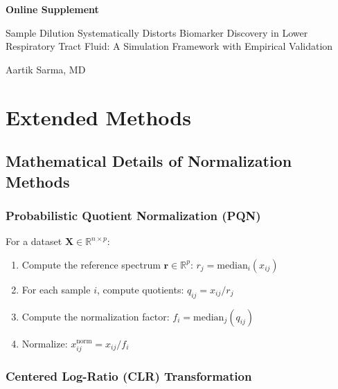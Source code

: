 \documentclass[12pt]{article}
\begin{document}
\begin{center}
{\Large\bfseries Online Supplement}

\vspace{0.5cm}

{\large Sample Dilution Systematically Distorts Biomarker Discovery in Lower Respiratory Tract Fluid: A Simulation Framework with Empirical Validation}

\vspace{0.5cm}

Aartik Sarma, MD

\end{center}

\vspace{1cm}

\tableofcontents

\newpage

\section{Extended Methods}

\subsection{Mathematical Details of Normalization Methods}

\subsubsection{Probabilistic Quotient Normalization (PQN)}

For a dataset $\mathbf{X} \in \mathbb{R}^{n \times p}$:
\begin{enumerate}
\item Compute the reference spectrum $\mathbf{r} \in \mathbb{R}^{p}$: $r_j = \mathrm{median}_i(x_{ij})$
\item For each sample $i$, compute quotients: $q_{ij} = x_{ij} / r_j$
\item Compute the normalization factor: $f_i = \mathrm{median}_j(q_{ij})$
\item Normalize: $x_{ij}^{\mathrm{norm}} = x_{ij} / f_i$
\end{enumerate}

\subsubsection{Centered Log-Ratio (CLR) Transformation}
\end{document}
